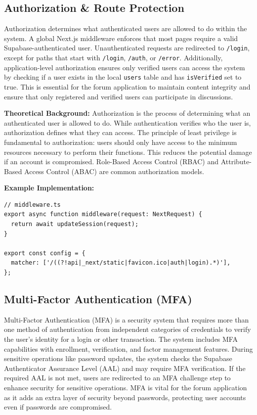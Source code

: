 \subsection{Authorization \& Route Protection}

Authorization determines what authenticated users are allowed to do within the system. A global Next.js middleware enforces that most pages require a valid Supabase-authenticated user. Unauthenticated requests are redirected to \texttt{/login}, except for paths that start with \texttt{/login}, \texttt{/auth}, or \texttt{/error}. Additionally, application-level authorization ensures only verified users can access the system by checking if a user exists in the local \texttt{users} table and has \texttt{isVerified} set to true. This is essential for the forum application to maintain content integrity and ensure that only registered and verified users can participate in discussions.

\textbf{Theoretical Background:} Authorization is the process of determining what an authenticated user is allowed to do. While authentication verifies who the user is, authorization defines what they can access. The principle of least privilege is fundamental to authorization: users should only have access to the minimum resources necessary to perform their functions. This reduces the potential damage if an account is compromised. Role-Based Access Control (RBAC) and Attribute-Based Access Control (ABAC) are common authorization models.

\textbf{Example Implementation:}
\begin{verbatim}
// middleware.ts
export async function middleware(request: NextRequest) {
  return await updateSession(request);
}

export const config = {
  matcher: ['/((?!api|_next/static|favicon.ico|auth|login).*)'],
};
\end{verbatim}

\subsection{Multi-Factor Authentication (MFA)}

Multi-Factor Authentication (MFA) is a security system that requires more than one method of authentication from independent categories of credentials to verify the user's identity for a login or other transaction. The system includes MFA capabilities with enrollment, verification, and factor management features. During sensitive operations like password updates, the system checks the Supabase Authenticator Assurance Level (AAL) and may require MFA verification. If the required AAL is not met, users are redirected to an MFA challenge step to enhance security for sensitive operations. MFA is vital for the forum application as it adds an extra layer of security beyond passwords, protecting user accounts even if passwords are compromised.

